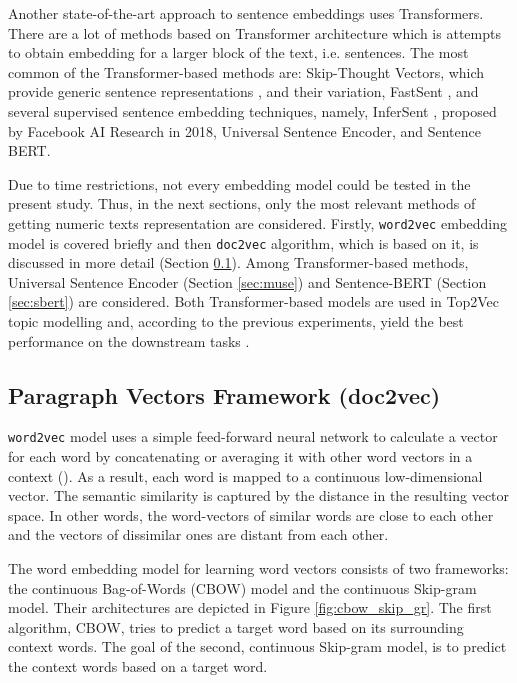 \documentclass[fontsize=12pt,a4paper,twoside,openany]{scrbook}
\begin{document}
Another state-of-the-art approach to sentence embeddings uses Transformers. There are a lot of methods based on Transformer architecture which is attempts to obtain embedding for a larger block of the text, i.e. sentences. The most common of the Transformer-based methods are: Skip-Thought Vectors, which provide generic sentence representations \parencite{Kiros15}, and their variation, FastSent \parencite{Hill16}, and several supervised sentence embedding techniques, namely, InferSent \parencite{Conneau17}, proposed by Facebook AI Research in 2018, Universal Sentence Encoder, and Sentence BERT.

Due to time restrictions, not every embedding model could be tested in the present study. Thus, in the next sections, only the most relevant methods of getting numeric texts representation are considered. Firstly, \verb|word2vec| embedding model is covered briefly and then \verb|doc2vec| algorithm, which is based on it, is discussed in more detail (Section \ref{sec:doc2vec}). Among Transformer-based methods, Universal Sentence Encoder (Section \ref{sec:muse}) and Sentence-BERT (Section \ref{sec:sbert}) are considered. Both Transformer-based models are used in Top2Vec topic modelling and, according to the previous experiments, yield the best performance on the downstream tasks \parencite{Wang20}.

\subsection{Paragraph Vectors Framework (doc2vec)}
\label{sec:doc2vec}

\verb|word2vec| model uses a simple feed-forward neural network to calculate a vector for each word by concatenating or averaging it with other word vectors in a context (). As a result, each word is mapped to a continuous low-dimensional vector. The semantic similarity is captured by the distance in the resulting vector space. In other words, the word-vectors of similar words are close to each other and the vectors of dissimilar ones are distant from each other.

The word embedding model for learning word vectors consists of two frameworks: the continuous Bag-of-Words (CBOW) model and the continuous Skip-gram model. Their architectures are depicted in Figure \ref{fig:cbow_skip_gr}. The first algorithm, CBOW, tries to predict a target word based on its surrounding context words. The goal of the second, continuous Skip-gram model, is to predict the context words based on a target word.
\end{document}
